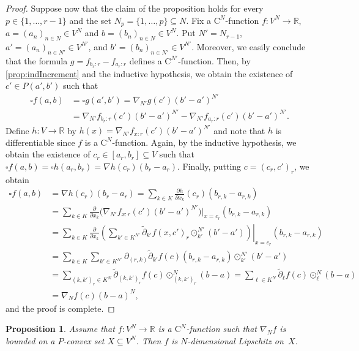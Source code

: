 \documentclass{amsart}
\theoremstyle{plain}%
\newtheorem{proposition}[theorem]{Proposition}
\theoremstyle{definition}
\theoremstyle{remark}
\begin{document}
\begin{proof}
Suppose now that the claim of the proposition holds for every $p\in\{1,\ldots,r-1\}$ and the set $N_p=\{1,\ldots,p\}\subseteq N$. 
Fix a $\mathrm{C}^{N}$\nobreakdash-function $f\colon V^{N}\to \mathbb{R}$, 
$a=(a_n)_{n\in N}\in V^{N}$ and $b=(b_n)_{n\in N}\in V^{N}$. Put $N'=N_{r-1}$,
$a'=(a_n)_{n\in N'}\in V^{N'}$, and $b'=(b_n)_{n\in N'}\in V^{N'}$. 
Moreover, we easily conclude that the formula $g=f_{b_{r}{:}r}-f_{a_{r}{:}r}$ defines a $\mathrm{C}^{N'}$\nobreakdash-function. Then, by \cref{prop:indIncrement} and the inductive hypothesis, we obtain the existence of $c'\in P(a',b')$ such that 
\begin{align*}
\square f(a,b)&=\square g(a',b')=\nabla\!_{N'}g(c')(b'-a')^{N'}\\
&=\nabla\!_{N'}f_{b_{r}{:}r}(c')(b'-a')^{N'}
-\nabla\!_{N'}f_{a_{r}{:}r}(c')(b'-a')^{N'}.
\end{align*}
Define $h\colon V\to\mathbb{R}$ by
$%
h(x)=\nabla\!_{N'}f_{x{:}r}(c')(b'-a')^{N'}
$%
and note that $h$ is differentiable since $f$ is a $\mathrm{C}^{N}$\nobreakdash-function.
Again, by the inductive hypothesis, we obtain the existence of $c_{r}\in [a_{r},b_{r}]\subseteq V$ such that $\square f(a,b)=\square h(a_r,b_r)=\nabla h(c_r)(b_r-a_r)$. Finally, putting  $c=(c_r,c')_r$, we obtain 
\begin{align*}
\square f(a,b)&=\nabla h(c_r)(b_r-a_r)
=\sum_{k\in K}\frac{\partial h}{\partial x_k}(c_r)(b_{r,k}-a_{r,k})\\
&=\sum_{k\in K}\frac{\partial}{\partial x_k} \big(\nabla\!_{N'}f_{x{:}r} (c')(b'-a')^{N'}\big)\big|_{x=c_r}(b_{r,k}-a_{r,k})\\
&=\sum_{k\in K}\left.\frac{\partial}{\partial x_k}\left(\sum_{k'\in K^{N'}}
\widetilde{\partial}_{k'}f(x,c')_r\odot^{N'}_{k'}(b'-a')\right)
\right|_{x=c_r}(b_{r,k}-a_{r,k})\\
&=\sum_{k\in K}\sum_{k'\in K^{N'}}\partial_{(r,k)}\widetilde{\partial}_{k'}
f(c)(b_{r,k}-a_{r,k})\odot^{N'}_{k'}(b'-a')\\
&=\sum_{(k,k')_r\in K^{N}}\widetilde{\partial}_{(k,k')_r}f(c)\odot^N_{(k,k')_r}(b-a)
=\sum_{\ell\in K^{N}}\widetilde{\partial}_{\ell}f(c)\odot^N_{\ell}(b-a)\\
&=\nabla\!_{N}f(c)(b-a)^{N},
\end{align*}
and the proof is complete.
\end{proof}

\begin{proposition}\label{prop:NdimLipschitzOfCNfunction}
Assume that $f\colon V^N\to \mathbb{R}$ is a $\mathrm{C}^N$\nobreakdash-function such that $\nabla\!_Nf$ is bounded on a $P$\nobreakdash-convex set $X\subseteq V^N$. Then $f$ is $N$\nobreakdash-dimensional Lipschitz on~$X$. 
\end{proposition} 
\end{document}
